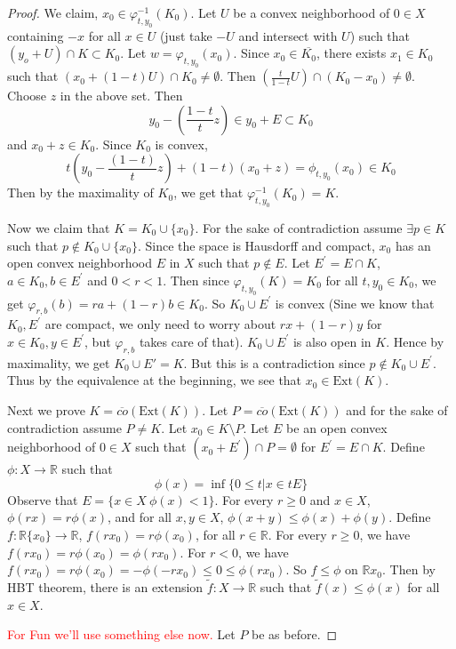 \begin{proof}
  We claim, $x_0 \in \varphi_{t, y_0}^{-1}(K_0)$.  Let $U$ be a convex neighborhood of $0 \in X$ containing $-x$ for all $x \in U$ (just take $-U$ and intersect with $U$) such that $(y_o + U) \cap K \subset K_0$. Let $w = \varphi_{t, y_0}(x_0)$. Since $x_0 \in \overline{K_0}$, there exists $x_1 \in K_0$ such that $(x_0 + (1-t)U) \cap K_0 \neq \emptyset$. Then $( \frac{t}{1-t}U  )\cap (K_0 - x_0) \neq \emptyset$. Choose $z$ in the above set. Then \[
    y_0 - ( \frac{1-t}{t}z ) \in y_0 + E \subset K_0
  \]
  and $x_0 + z \in K_0$. Since $K_0$ is convex, \[
    t(y_0 - \frac{(1-t)}{t}z) + (1-t)(x_0 + z)  = \phi_{t, y_0}(x_0) \in K_0
  \]
  Then by the maximality of $K_0$, we get that $\varphi^{-1}_{t, y_0}(K_0) = K$.

  Now we claim that $K = K_0 \cup \{ x_0 \}$. For the sake of contradiction assume $\exists p \in K$ such that $p \notin K_0 \cup \{ x_0 \}$. Since the space is Hausdorff and compact, $x_0$ has an open convex neighborhood $E$ in $X$ such that $p \not\in E$. Let $E^\prime = E \cap K$, $a \in K_0, b \in E^\prime$ and $0 < r < 1$. Then since $\varphi_{t, y_0}(K) = K_0$ for all $t, y_0 \in K_0$, we get $\varphi_{r, b}(b) = ra + (1-r)b \in K_0$. So $K_0 \cup E^\prime$ is convex (Sine we know that $K_0, E^\prime$ are compact, we only need to worry about $rx + (1-r)y$ for $x \in K_0, y \in E^\prime$, but $\varphi_{r, b}$ takes care of that). $K_0 \cup E^\prime$ is also open in $K$. Hence by maximality, we get $K_0 \cup E' = K$. But this is a contradiction since $ p \not\in K_0 \cup E^\prime$. Thus by the equivalence at the beginning, we see that $x_0 \in \textrm{Ext}(K)$.

  Next we prove $K = \overline{co}(\textrm{Ext}(K))$. Let $P = \overline{co}(\textrm{Ext}(K))$ and for the sake of contradiction assume $P \neq K$. Let $ x_0 \in K \setminus P$. Let $E$ be an open convex neighborhood of $0 \in X$ such that $(x_0 + E^\prime) \cap P = \emptyset$ for $E^\prime = E \cap K$. Define $\phi: X \to \mathbb{R}$ such that \[
    \phi(x) = \inf \{ 0 \le t \big | x \in tE \}
  \]
  Observe that $E = \{ x \in X \: \phi(x) < 1 \}$. For every $r \ge 0$ and $x \in X$, $\phi(rx) = r \phi(x)$, and for all $x, y \in X$, $ \phi(x+y) \le \phi(x) + \phi(y)$. Define $f:  \mathbb{R}\{ x_0 \} \to \mathbb{R}$, $f(rx_0) = r \phi(x_0)$, for all $r \in \mathbb{R}$. For every $r \ge 0$, we have $f(rx_0) = r \phi(x_0) = \phi(rx_0)$. For $r < 0$, we have $f(rx_0) = r \phi(x_0) = -\phi(-rx_0) \le 0 \le \phi(rx_0)$. So $f \le \phi$ on $\mathbb{R} x_0$. Then by HBT theorem, there is an extension $ \tilde{f}: X \to \mathbb{R}$ such that $\tilde{f}(x) \le \phi(x) $ for all $x \in X$.

  \textcolor{red}{For Fun we'll use something else now.}
  Let $P$ be as before.
\end{proof}



